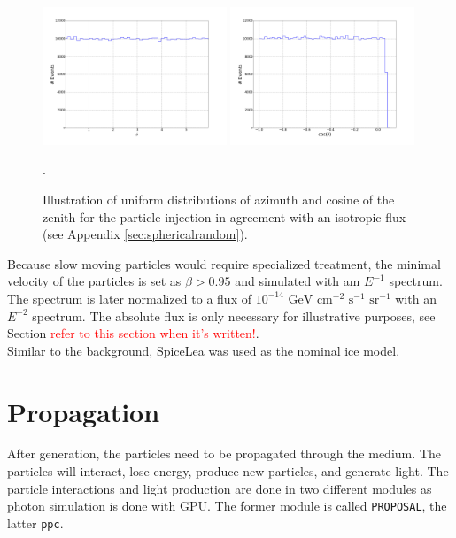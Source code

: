 \begin{figure}[t]
\centering
\includegraphics[width=0.49\textwidth]{chapter6/img/Azimuth}
\includegraphics[width=0.49\textwidth]{chapter6/img/Zenith}
\caption{Illustration of uniform distributions of azimuth and cosine of the zenith for the particle injection in agreement with an isotropic flux (see Appendix \ref{sec:sphericalrandom}).}.
\label{fig:angles}
\end{figure}

\noindent Because slow moving particles would require specialized treatment, the minimal velocity of the particles is set as $\beta > 0.95$ and simulated with am $E^{-1}$ spectrum. The spectrum is later normalized to a flux of $10^{-14} \textrm{ GeV } \textrm{cm}^{-2} \textrm{ s}^{-1} \textrm{ sr}^{-1}$ with an $E^{-2}$ spectrum. The absolute flux is only necessary for illustrative purposes, see Section \textcolor{red}{refer to this section when it's written!}.\\

\noindent Similar to the background, SpiceLea was used as the nominal ice model.

\section{Propagation}
After generation, the particles need to be propagated through the medium. The particles will interact, lose energy, produce new particles, and generate light. The particle interactions and light production are done in two different modules as photon simulation is done with GPU. The former module is called \texttt{PROPOSAL}, the latter \texttt{ppc}.




